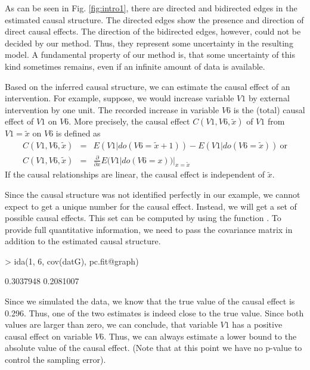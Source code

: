 \documentclass[article]{jss}
\begin{document}
As can be seen in Fig. \ref{fig:intro1}, there are directed and bidirected
edges in the estimated causal structure. The directed edges show the
presence and direction of direct causal effects. The direction of the
bidirected edges, however, could not be decided by our method. Thus, they
represent some uncertainty in the resulting model. A fundamental property
of our method is, that some uncertainty of this kind sometimes remains,
even if an infinite amount of data is available.

Based on the inferred causal structure, we can estimate the causal effect
of an intervention. For example, suppose, we would increase variable $V1$
by external intervention by one unit. The recorded increase in variable
$V6$ is the (total) causal effect of $V1$ on $V6$. More precisely, the
causal effect $C(V1, V6, \tilde{x})$ of $V1$ from $V1 = \tilde{x}$ on $V6$
is defined as
\begin{eqnarray*}
C(V1, V6, \tilde{x}) &=& E(V1|do(V6 = \tilde{x} + 1)) - E(V1|do(V6 = \tilde{x})) \ \mbox{or} \\
C(V1, V6, \tilde{x}) &=& \frac{\partial}{\partial x} E(V1|do(V6 = x))|_{x=\tilde{x}}
\end{eqnarray*}
If the causal relationships are linear, the causal effect is independent of
$\tilde{x}$.  

Since the causal structure was not identified perfectly in our example, we
cannot expect to get a unique number for the causal effect. Instead, we will get a set of
possible causal effects. This set can be computed by using the function
. To provide full quantitative information, we need to pass the
covariance matrix in addition to the estimated causal structure.

\begin{Schunk}
\begin{Sinput}
> ida(1, 6, cov(datG), pc.fit@graph)
\end{Sinput}
\begin{Soutput}
[1] 0.3037948 0.2081007
\end{Soutput}
\end{Schunk}

Since we simulated the data, we know that the true value of the causal
effect is 0.296. Thus, one of the two estimates is indeed close to the true
value. Since both values are larger than zero, we can conclude, that
variable $V1$ has a positive causal effect on variable $V6$. Thus, we can
always estimate a lower bound to the absolute value of the causal
effect. (Note that at this point we have no p-value to control the sampling
error).
\end{document}
